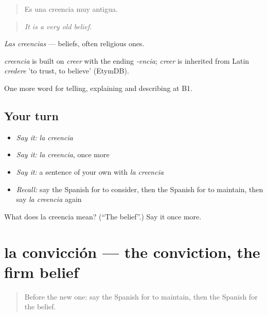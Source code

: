 \begin{quote}
Es una creencia muy antigua.
\end{quote}

\begin{quote}
\emph{It is a very old belief.}
\end{quote}

\emph{Las creencias} — beliefs, often religious ones.

\begin{cousinweb}
\emph{creencia} is built on \emph{creer} with the ending \emph{-encia}; \emph{creer} is inherited from Latin \emph{credere} 'to trust, to believe' (EtymDB).
\end{cousinweb}

\begin{grammarlens}[title={What you've built}]
One more word for telling, explaining and describing at B1.
\end{grammarlens}

\subsection*{Your turn}
\begin{itemize}
\raggedright
  \item \emph{Say it:} \emph{la creencia}
  \item \emph{Say it:} \emph{la creencia}, once more
  \item \emph{Say it:} a sentence of your own with \emph{la creencia}
  \item \emph{Recall:} say the Spanish for to consider, then the Spanish for to maintain, then say \emph{la creencia} again
\end{itemize}

\begin{tcolorbox}[breakable,colback=teal!4,colframe=teal!35!black,title={Before you move on}]
What does la creencia mean? (\textquotedblleft{}The belief\textquotedblright{}.) Say it once more.
\end{tcolorbox}
\section[la convicción]{la convicción — the conviction, the firm belief}

\label{lesson:ES-C576-conviccion}



\begin{quote}
Before the new one: say the Spanish for to maintain, then the Spanish for the belief.
\end{quote}

